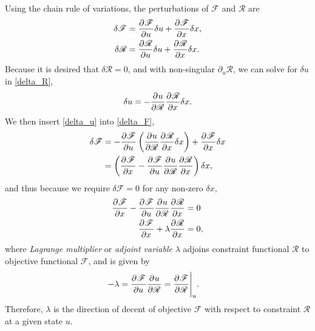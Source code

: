 Using the chain rule of variations, the perturbations of $\mathscr{F}$ and $\mathscr{R}$ are
\begin{align}
  \label{delta_F}
  \delta \mathscr{F} &= \frac{\partial{^{}} \mathscr{F}}{\partial u{^{}} } \delta u + \frac{\partial{^{}} \mathscr{F}}{\partial x{^{}} } \delta x, \\
  \label{delta_R}
  \delta \mathscr{R} &= \frac{\partial{^{}} \mathscr{R}}{\partial u{^{}} } \delta u + \frac{\partial{^{}} \mathscr{R}}{\partial x{^{}} } \delta x.
\end{align}
Because it is desired that $\delta \mathscr{R} = 0$, and with non-singular $\partial_{u} \mathscr{R}$, we can solve for $\delta u$ in \cref{delta_R},
\begin{align}
  \label{delta_u}
  \delta u = - \frac{\partial{^{}} u}{\partial \mathscr{R}{^{}} } \frac{\partial{^{}} \mathscr{R}}{\partial x{^{}} } \delta x.
\end{align}
We then insert \cref{delta_u} into \cref{delta_F},
\begin{align}
  \delta \mathscr{F} &= - \frac{\partial{^{}} \mathscr{F}}{\partial u{^{}} } \left( \frac{\partial{^{}} u}{\partial \mathscr{R}{^{}} } \frac{\partial{^{}} \mathscr{R}}{\partial x{^{}} } \delta x \right) + \frac{\partial{^{}} \mathscr{F}}{\partial x{^{}} } \delta x \notag \\
  &= \left(\frac{\partial{^{}} \mathscr{F}}{\partial x{^{}} }  - \frac{\partial{^{}} \mathscr{F}}{\partial u{^{}} } \frac{\partial{^{}} u}{\partial \mathscr{R}{^{}} } \frac{\partial{^{}} \mathscr{R}}{\partial x{^{}} } \right) \delta x,
\end{align}
and thus because we require $\delta \mathscr{F} = 0$ for any non-zero $\delta x$,
\begin{align}
  \frac{\partial{^{}} \mathscr{F}}{\partial x{^{}} } - \frac{\partial{^{}} \mathscr{F}}{\partial u{^{}} } \frac{\partial{^{}} u}{\partial \mathscr{R}{^{}} } \frac{\partial{^{}} \mathscr{R}}{\partial x{^{}} } &=0 \notag \\
  \label{condition_two}
  \frac{\partial{^{}} \mathscr{F}}{\partial x{^{}} } + \lambda \frac{\partial{^{}} \mathscr{R}}{\partial x{^{}} } &=0,
\end{align}
where  \emph{Lagrange multiplier} or  \emph{adjoint variable} $\lambda$  adjoins constraint functional $\mathscr{R}$ to objective functional $\mathscr{F}$, and is given by
\begin{align}
  -\lambda &= \frac{\partial{^{}} \mathscr{F}}{\partial u{^{}} } \frac{\partial{^{}} u}{\partial \mathscr{R}{^{}} } = \frac{\partial{^{}} \mathscr{F}}{\partial \mathscr{R}{^{}} } \Bigg|_{u}.
\end{align}
Therefore, $\lambda$ is the direction of decent of objective $\mathscr{F}$ with respect to constraint $\mathscr{R}$ at a given state $u$.

